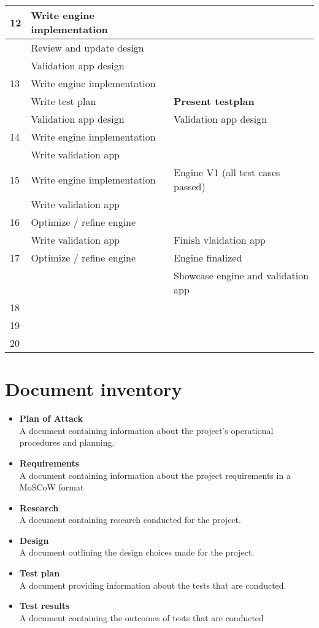 \documentclass{article} %
\begin{document}
\begin{longtable}{|l|p{}|p{}|}
    12 & Write engine implementation &  \\ \hline
       & Review and update design & \\ \hline
       & Validation app design & \\ \hline
    13 & Write engine implementation & \\ \hline
       & Write test plan & \textbf{Present testplan} \\ \hline
       & Validation app design & Validation app design \\ \hline
    14 & Write engine implementation &  \\ \hline
       & Write validation app & \\ \hline
    15 & Write engine implementation & Engine V1 (all test cases passed) \\ \hline
       & Write validation app & \\ \hline
    16 & Optimize / refine engine &  \\ \hline
       & Write validation app & Finish vlaidation app \\ \hline
    17 & Optimize / refine engine & Engine finalized \\ \hline
       & & Showcase engine and validation app \\ \hline
    18 &  &  \\ \hline
    19 &  &  \\ \hline
    20 &  &  \\ \hline
    \end{longtable}
    \newpage

    \section{Document inventory}
    \begin{itemize}
        \item \textbf{Plan of Attack}
        \\
        A document containing information about the project's operational procedures and planning.
        \item \textbf{Requirements}
        \\
        A document containing information about the project requirements in a MoSCoW format
        \item \textbf{Research}
        \\
        A document containing research conducted for the project.
        \item \textbf {Design}
        \\
        A document outlining the design choices made for the project.
        \item \textbf {Test plan}
        \\
        A document providing information about the tests that are conducted.
        \item \textbf {Test results}
        \\
        A document containing the outcomes of tests that are conducted
    \end{itemize}
\end{document}

